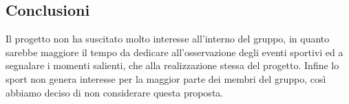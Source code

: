 \documentclass[../studio-di-fattibilita.tex]{subfiles}
\begin{document}
	\subsection{Conclusioni}
	\label{subsec:conclusioni}
	Il progetto non ha suscitato molto interesse all'interno del gruppo, in quanto sarebbe maggiore il tempo da dedicare all'osservazione degli eventi sportivi ed a segnalare i momenti salienti, che alla realizzazione stessa del progetto. Infine lo sport non genera interesse per la maggior parte dei membri del gruppo, così abbiamo deciso di non considerare questa proposta.
\end{document}
